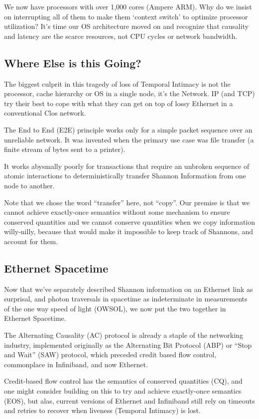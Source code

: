 We now have processors with over 1,000 cores (Ampere ARM). Why do we insist on interrupting all of them to make them ‘context switch’ to optimize processor utilization? It’s time our OS architecture moved on and recognize that causality and latency are the scarce resources, not CPU cycles or network bandwidth.

\subsection{Where Else is this Going?}

The biggest culprit in this tragedy of loss of Temporal Intimacy is not the processor, cache hierarchy or OS in a single node, it's the Network.
IP (and TCP) try their best to cope with what they can get on top of lossy Ethernet in a conventional Clos network.

The End to End (E2E) principle works only for a simple packet sequence over an unreliable network. It was invented when the primary use case was file transfer (a finite stream of bytes sent to a printer).

It works abysmally poorly for transactions that require an unbroken sequence of atomic interactions to deterministically transfer Shannon Information from one node to another.

Note that we chose the word “transfer” here, not “copy”. Our premise is that we cannot achieve exactly-once semantics without some mechanism to ensure conserved quantities and we cannot conserve quantities when we copy information willy-nilly, because that would make it impossible to keep track of Shannons, and account for them.

\subsection{Ethernet Spacetime}
Now that we’ve separately described Shannon information on an Ethernet link as surprisal, and photon traversals in spacetime as indeterminate in measurements of the one way speed of light (OWSOL), we now put the two together in Ethernet Spacetime.

The Alternating Causality (AC) protocol is already a staple of the networking industry, implemented originally as the Alternating Bit Protocol (ABP) or “Stop and Wait” (SAW) protocol, which preceded credit based flow control, commonplace in Infiniband, and now Ethernet.

Credit-based flow control has the semantics of conserved quantities (CQ), and one might consider building on this to try and achieve exactly-once semantics (EOS), but alas, current versions of Ethernet and Infiniband still rely on timeouts and retries to recover when liveness (Temporal Intimacy) is lost.


